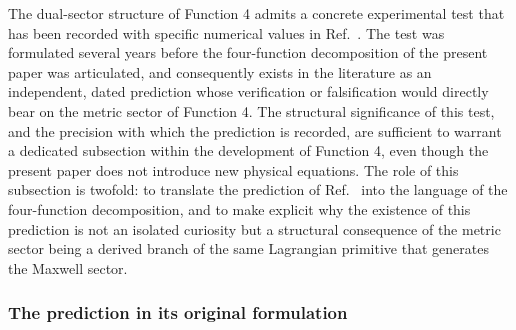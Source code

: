 \documentclass[%
 reprint, amsmath,amssymb, aps, prb, ]{revtex4-2}
\numberwithin{equation}{section}
\begin{document}
The dual-sector structure of Function 4 admits a concrete experimental test that has been recorded with specific numerical values in Ref.~\cite{hanamura22}. The test was formulated several years before the four-function decomposition of the present paper was articulated, and consequently exists in the literature as an independent, dated prediction whose verification or falsification would directly bear on the metric sector of Function 4. The structural significance of this test, and the precision with which the prediction is recorded, are sufficient to warrant a dedicated subsection within the development of Function 4, even though the present paper does not introduce new physical equations. The role of this subsection is twofold: to translate the prediction of Ref.~\cite{hanamura22} into the language of the four-function decomposition, and to make explicit why the existence of this prediction is not an isolated curiosity but a structural consequence of the metric sector being a derived branch of the same Lagrangian primitive that generates the Maxwell sector.

\subsubsection{The prediction in its original formulation}
\end{document}
